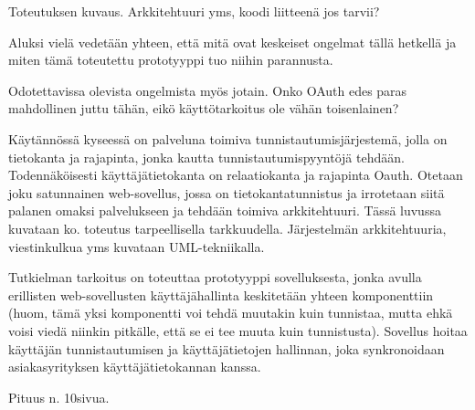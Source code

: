 Toteutuksen kuvaus. Arkkitehtuuri yms, koodi liitteenä jos tarvii?

Aluksi vielä vedetään yhteen, että mitä ovat keskeiset ongelmat tällä hetkellä ja miten tämä toteutettu prototyyppi tuo niihin parannusta.

Odotettavissa olevista ongelmista myös jotain. Onko OAuth edes paras mahdollinen juttu tähän, eikö käyttötarkoitus ole vähän toisenlainen?

Käytännössä kyseessä on palveluna toimiva tunnistautumisjärjestemä, jolla on tietokanta ja rajapinta, jonka kautta tunnistautumispyyntöjä tehdään. Todennäköisesti käyttäjätietokanta on relaatiokanta ja rajapinta Oauth. Otetaan joku satunnainen web-sovellus, jossa on tietokantatunnistus ja irrotetaan siitä palanen omaksi palvelukseen ja tehdään toimiva arkkitehtuuri. Tässä luvussa kuvataan ko. toteutus tarpeellisella tarkkuudella. Järjestelmän arkkitehtuuria, viestinkulkua yms kuvataan UML-tekniikalla.

Tutkielman tarkoitus on toteuttaa prototyyppi sovelluksesta, jonka avulla erillisten web-sovellusten käyttäjähallinta keskitetään yhteen komponenttiin (huom, tämä yksi komponentti voi tehdä muutakin kuin tunnistaa, mutta ehkä voisi viedä niinkin pitkälle, että se ei tee muuta kuin tunnistusta). Sovellus hoitaa käyttäjän tunnistautumisen ja käyttäjätietojen hallinnan, joka synkronoidaan asiakasyrityksen käyttäjätietokannan kanssa.

Pituus n. 10sivua.
